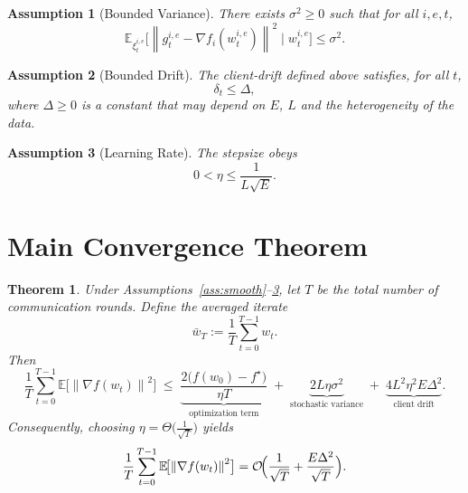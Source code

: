 \documentclass{article}
\newtheorem{theorem}{Theorem}
\newtheorem{assumption}{Assumption}
\newcommand{\E}{\mathbb{E}}
\newcommand{\norm}[1]{\left\lVert#1\right\rVert}
\begin{document}
\begin{assumption}[Bounded Variance]\label{ass:variance}
There exists $\sigma^2\ge0$ such that for all $i,e,t$,
\[
\E_{\xi_{t}^{i,e}}\!\bigl[\norm{g_{t}^{i,e}-\nabla f_i(w_{t}^{i,e})}^2\mid w_{t}^{i,e}\bigr]\le\sigma^2 .
\]
\end{assumption}

\begin{assumption}[Bounded Drift]\label{ass:drift}
The client‑drift defined above satisfies, for all $t$,
\[
\delta_t\le \Delta ,
\]
where $\Delta\ge0$ is a constant that may depend on $E$, $L$ and the heterogeneity of the data.
\end{assumption}

\begin{assumption}[Learning Rate]\label{ass:lr}
The stepsize obeys
\[
0<\eta\le\frac{1}{L\sqrt{E}} .
\]
\end{assumption}

\section*{Main Convergence Theorem}
\begin{theorem}\label{thm:main}
Under Assumptions~\ref{ass:smooth}--\ref{ass:lr}, let $T$ be the total number of communication rounds.
Define the averaged iterate 
\[
\bar w_T:=\frac{1}{T}\sum_{t=0}^{T-1} w_t .
\]
Then
\[
\frac{1}{T}\sum_{t=0}^{T-1}\E\!\bigl[\norm{\nabla f(w_t)}^2\bigr]
\;\le\;
\underbrace{\frac{2\bigl(f(w_0)-f^\star\bigr)}{\eta T}}_{\text{optimization term}}
\;+\;
\underbrace{2L\eta\sigma^2}_{\text{stochastic variance}}
\;+\;
\underbrace{4L^2\eta^2E\Delta^2}_{\text{client drift}} .
\]
Consequently, choosing $\eta = \Theta\!\bigl(\frac{1}{\sqrt{T}}\bigr)$ yields
\[
\frac{1}{T}\sum_{t=0}^{T-1}\E\!\bigl[\norm{\nabla f(w_t)}^2\bigr]=
\mathcal{O}\!\Bigl(\frac{1}{\sqrt{T}}+ \frac{E\Delta^2}{\sqrt{T}}\Bigr).
\]
\end{theorem}
\end{document}
